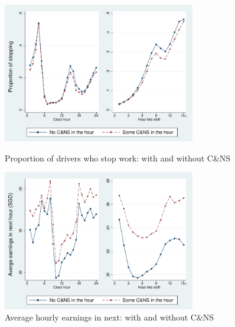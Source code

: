 \documentclass[reviewmode]{restat}
\begin{document}

\begin{figure}
	{\centering
		\includegraphics[width=0.75\textwidth]{./fg/modelfree_quit_vert.pdf}
		\caption{Proportion of drivers who stop work: with and without C\&NS}
		\label{fg:quitbyhour}
	}

	{\centering
		\includegraphics[width=0.75\textwidth]{./fg/modelfree_earnings_vert.pdf}
		\caption{Average hourly earnings in next: with and without C\&NS}
		\label{fg:earningsbyhour}
	}
\end{figure}
\end{document}

